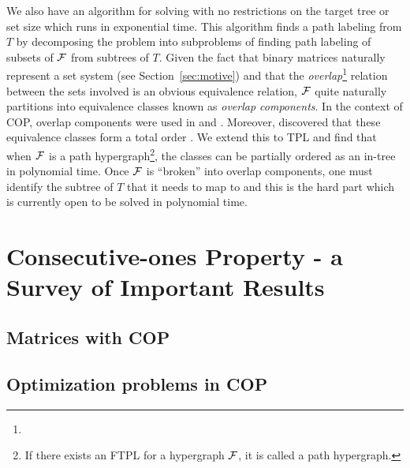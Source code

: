 \documentclass[MS]             %
              {iitmdiss_as}    %
\begin{document}
We also have an algorithm for solving {\CFTPL} with no restrictions on
the target tree or set size which runs in exponential time.  This
algorithm finds a path labeling from $T$ by decomposing the problem
into subproblems of finding path labeling of subsets of ${\cal F}$ from
subtrees of $T$. Given the fact that binary matrices naturally
represent a set system (see Section~\ref{sec:motive}) and that the
{\em overlap}\footnote{}
relation between the sets involved is an obvious equivalence relation,
${\cal F}$ quite naturally partitions into equivalence classes known as
{\em overlap components}. In the context of COP, overlap components were used in
\cite{wlh02} and \cite{kklv10}. Moreover, \cite{nsnrs09} discovered
that these equivalence classes form a total order . We extend this to TPL
and find that when ${\cal F}$ is a path hypergraph\footnote{If there exists
  an FTPL for a hypergraph ${\cal F}$, it is called a path hypergraph.},
the classes can be partially ordered as an in-tree in polynomial
time. Once ${\cal F}$ is ``broken'' into overlap components, one must
identify the subtree of $T$ that it needs to map to and this is the
hard part which is currently open to be solved in polynomial time.


\chapter{Consecutive-ones Property - a Survey of Important Results}
\label{ch:copsurvey}


\section{Matrices with COP}
\label{sec:surveycoptest}

\section{Optimization problems in COP}
\label{sec:surveycopopt}
\end{document}
